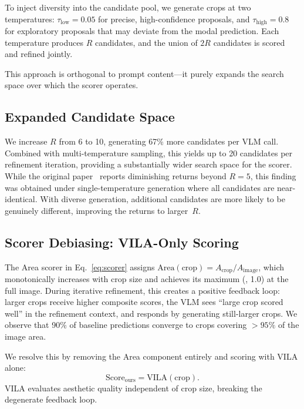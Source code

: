 To inject diversity into the candidate pool, we generate crops at two
temperatures: $\tau_{\text{low}} = 0.05$ for precise, high-confidence
proposals, and $\tau_{\text{high}} = 0.8$ for exploratory proposals
that may deviate from the modal prediction.  Each temperature produces
$R$ candidates, and the union of $2R$ candidates is scored and refined
jointly.

This approach is orthogonal to prompt content---it purely expands the
search space over which the scorer operates.

\subsection{Expanded Candidate Space}
\label{sec:bigr}

We increase $R$ from 6 to 10, generating 67\% more candidates per VLM
call.  Combined with multi-temperature sampling, this yields up to 20
candidates per refinement iteration, providing a substantially wider
search space for the scorer.  While the original paper~\cite{cropper2025}
reports diminishing returns beyond $R = 5$, this finding was obtained
under single-temperature generation where all candidates are
near-identical.  With diverse generation, additional candidates are
more likely to be genuinely different, improving the returns to
larger~$R$.

\subsection{Scorer Debiasing: VILA-Only Scoring}
\label{sec:scorer_debias}

The Area scorer in Eq.~\eqref{eq:scorer} assigns
$\text{Area}(\text{crop}) = A_{\text{crop}} / A_{\text{image}}$, which
monotonically increases with crop size and achieves its maximum
(\ie, 1.0) at the full image.  During iterative refinement, this
creates a positive feedback loop: larger crops receive higher composite
scores, the VLM sees ``large crop scored well'' in the refinement
context, and responds by generating still-larger crops.  We observe
that 90\% of baseline predictions converge to crops covering
$> 95\%$ of the image area.

We resolve this by removing the Area component entirely and scoring
with VILA alone:
\begin{equation}
    \text{Score}_{\text{ours}} = \text{VILA}(\text{crop}).
    \label{eq:scorer_ours}
\end{equation}
VILA evaluates aesthetic quality independent of crop size, breaking the
degenerate feedback loop.

